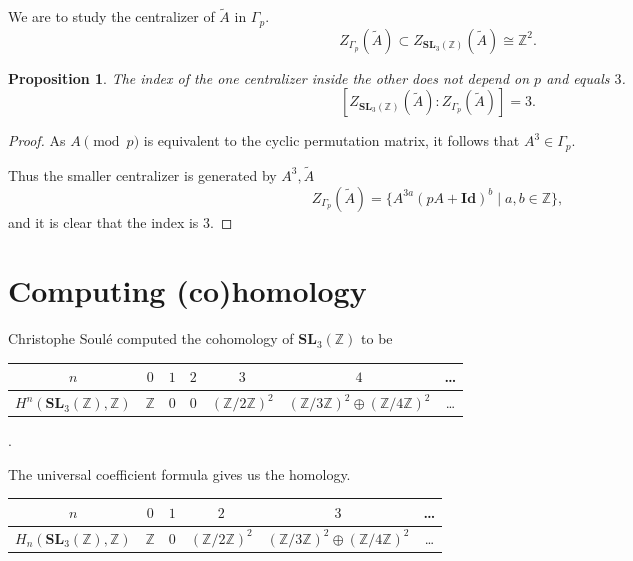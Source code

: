 \documentclass[a4paper]{article}
\newtheorem{Prop}[Thm]{Proposition}
\newcommand{\Id}{\mathbf{Id}}        %
\newcommand{\SL}{\mathbf{SL}_3(\mathbb{Z})}        %
\newcommand{\SLp}{\Gamma_p}        %
\begin{document}
We are to study the centralizer of $\tilde A$ in $\SLp$.
\[
Z_{\SLp}(\tilde A) \subset 
Z_{\SL}(\tilde A) \cong \mathbb{Z}^2
.\] 

\begin{Prop}
	The index of the one centralizer inside the other \emph{does not depend on $p$} and equals $3$.
\[
	[Z_{\SL}(\tilde A) : Z_{\SLp}(\tilde A) ] = 3
.\] 
\end{Prop}
\begin{proof}
As $A \pmod p$ is equivalent to the cyclic permutation matrix, it follows that $A^3 \in \SLp$.

Thus the smaller centralizer is generated by $A^3, \tilde A$
\[
Z_{\SLp}(\tilde A)
= \{ A^{3a} (p A + \Id)^b \mid a, b \in \mathbb{Z} \}
,\] 
and it is clear that the index is $3$.
\end{proof}

\section{Computing (co)homology}
Christophe Soulé \cite{soule1978}
computed the cohomology of $\SL$
to be
\begin{table}[h!]
	\centering
\begin{tabular}{|c|c|c|c|c|c|c}
	\hline
	$n$        & $0$                               & $1$                               & $2$                               & $3$                               & $4$  & \ldots\\
\hline 
	$H^n(\SL, \mathbb{Z})$ & $\mathbb{Z}$ & $0$ & $0$ & $(\mathbb{Z}/2\mathbb{Z})^{2} $ & $(\mathbb{Z}/3\mathbb{Z})^{2} \oplus (\mathbb{Z}/4\mathbb{Z})^{2} $ & \ldots \\
\hline
\end{tabular}.
\end{table}

The universal coefficient formula gives us the homology.
\begin{table}[h!]
	\centering
\begin{tabular}{|c|c|c|c|c|c}
	\hline
	$n$        & $0$                               & $1$                               & $2$                               & $3$                               & \ldots\\
\hline 
	$H_n(\SL, \mathbb{Z})$ & $\mathbb{Z}$ & $0$ &  $(\mathbb{Z}/2\mathbb{Z})^{2} $ & $(\mathbb{Z}/3\mathbb{Z})^{2} \oplus (\mathbb{Z}/4\mathbb{Z})^{2} $ & \ldots \\
\hline
\end{tabular}
\end{table}
\end{document}
